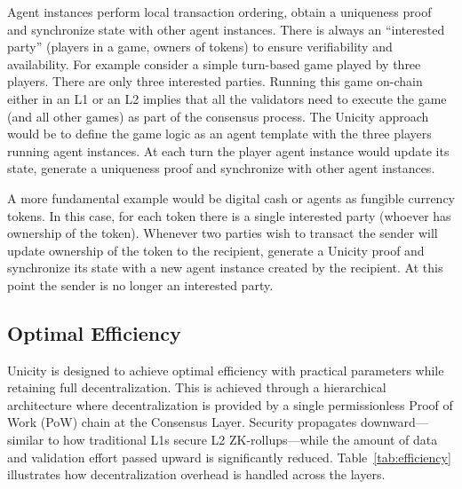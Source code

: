 \documentclass{article}
\begin{document}
Agent instances perform local transaction ordering, obtain a uniqueness proof and synchronize state with other agent instances. There is always an ``interested party'' (players in a game, owners of tokens) to ensure verifiability and availability. For example consider a simple turn-based game played by three players. There are only three interested parties. Running this game on-chain either in an L1 or an L2 implies that all the validators  need to execute the game (and all other games) as part of the consensus process. The Unicity approach would be to define the game logic as an agent template with the three players running agent instances. At each turn the player agent instance would update its state, generate a uniqueness proof and synchronize with other agent instances.

A more fundamental example would be digital cash or agents as fungible currency tokens. In this case, for each token there is a single interested party (whoever has ownership of the token). Whenever two parties wish to transact the sender will update ownership of the token to the recipient, generate a Unicity proof and synchronize its state with a new agent instance created by the recipient. At this point the sender is no longer an interested party.

\subsection{Optimal Efficiency}

Unicity is designed to achieve optimal efficiency with practical parameters while retaining full decentralization. This is achieved through a hierarchical architecture where decentralization is provided by a single permissionless Proof of Work (PoW) chain at the Consensus Layer. Security propagates downward---similar to how traditional L1s secure L2 ZK-rollups---while the amount of data and validation effort passed upward is significantly reduced. Table~\ref{tab:efficiency} illustrates how decentralization overhead is handled across the layers.
\end{document}
